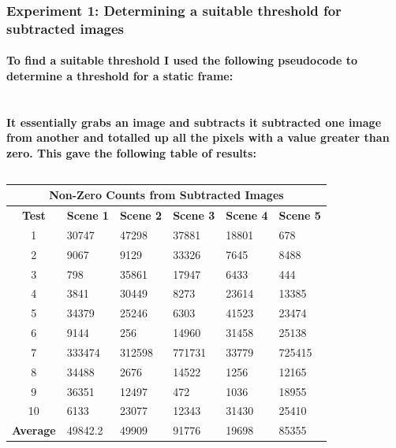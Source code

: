 \subsubsection{Experiment 1: Determining a suitable threshold for subtracted images}
\paragraph{To find a suitable threshold I used the following pseudocode to determine a threshold for a static frame:\\\\}
\begin{frame}[fragile]
	\vspace{-40pt}
	
\end{frame}
\paragraph{It essentially grabs an image and subtracts it subtracted one image from another and totalled up all the pixels with a value greater than zero. This gave the following table of results:}
\begin{center}
\begin{table}[!htbp]
	\begin{center}
	\begin{tabular}{| c | l | l | l | l | l | }
\hline
\multicolumn{6}{|c|}{\bf Non-Zero Counts from Subtracted Images} \\
\hline
\bf Test	&\bf Scene 1	&\bf Scene 2	&\bf Scene 3	&\bf Scene 4	&\bf Scene 5	\\ \hline
1	&30747	&47298	&37881	&18801	&678\\
2	&9067	&9129	&33326	&7645	&8488\\
3	&798	&35861	&17947	&6433	&444\\
4	&3841	&30449	&8273	&23614	&13385\\
5	&34379	&25246	&6303	&41523	&23474\\
6	&9144	&256	&14960	&31458	&25138\\
7	&333474	&312598	&771731	&33779	&725415\\
8	&34488	&2676	&14522	&1256	&12165\\
9	&36351	&12497	&472	&1036	&18955\\
10	&6133	&23077	&12343	&31430	&25410\\ \hline
\bf Average	&49842.2	&49909	&91776	&19698	&85355\\ \hline
	\end{tabular}
	\end{center}
	\caption{}
	\label{tab:sub1}
\end{table}
\end{center}
